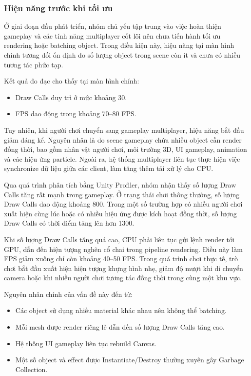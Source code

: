 \subsubsection{Hiệu năng trước khi tối ưu}

Ở giai đoạn đầu phát triển, nhóm chủ yếu tập trung vào việc hoàn thiện gameplay và các tính năng multiplayer cốt lõi nên chưa tiến hành tối ưu rendering hoặc batching object. Trong điều kiện này, hiệu năng tại màn hình chính tương đối ổn định do số lượng object trong scene còn ít và chưa có nhiều tương tác phức tạp.

Kết quả đo đạc cho thấy tại màn hình chính:
\begin{itemize}
    \item Draw Calls duy trì ở mức khoảng 30.
    \item FPS dao động trong khoảng 70--80 FPS.
\end{itemize}

Tuy nhiên, khi người chơi chuyển sang gameplay multiplayer, hiệu năng bắt đầu giảm đáng kể. Nguyên nhân là do scene gameplay chứa nhiều object cần render đồng thời, bao gồm nhân vật người chơi, môi trường 3D, UI gameplay, animation và các hiệu ứng particle. Ngoài ra, hệ thống multiplayer liên tục thực hiện việc synchronize dữ liệu giữa các client, làm tăng thêm tải xử lý cho CPU.

Qua quá trình phân tích bằng Unity Profiler, nhóm nhận thấy số lượng Draw Calls tăng rất mạnh trong gameplay. Ở trạng thái chơi thông thường, số lượng Draw Calls dao động khoảng 800. Trong một số trường hợp có nhiều người chơi xuất hiện cùng lúc hoặc có nhiều hiệu ứng được kích hoạt đồng thời, số lượng Draw Calls có thời điểm tăng lên hơn 1300.

Khi số lượng Draw Calls tăng quá cao, CPU phải liên tục gửi lệnh render tới GPU, dẫn đến hiện tượng nghẽn cổ chai trong pipeline rendering. Điều này làm FPS giảm xuống chỉ còn khoảng 40--50 FPS. Trong quá trình chơi thực tế, trò chơi bắt đầu xuất hiện hiện tượng khựng hình nhẹ, giảm độ mượt khi di chuyển camera hoặc khi nhiều người chơi tương tác đồng thời trong cùng một khu vực.

Nguyên nhân chính của vấn đề này đến từ:
\begin{itemize}
    \item Các object sử dụng nhiều material khác nhau nên không thể batching.
    \item Mỗi mesh được render riêng lẻ dẫn đến số lượng Draw Calls tăng cao.
    \item Hệ thống UI gameplay liên tục rebuild Canvas.
    \item Một số object và effect được Instantiate/Destroy thường xuyên gây Garbage Collection.
\end{itemize}


